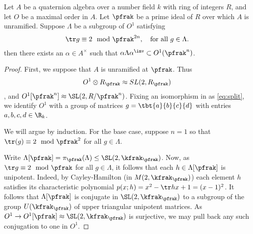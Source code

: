 \begin{lemma}\label{lemma:MangosteenPicosdeEuropa}
    Let $A$ be a quaternion algebra over a number field $k$ with ring of integers $R$, and let $O$ be a maximal order in $A$.
    Let $\pfrak$ be a prime ideal of $R$ over which $A$ is unramified.
    Suppose $\Lambda$ be a subgroup of $O^1$ satisfying
    \begin{align}\label{eq:trace}
        \tr g \equiv 2 \mod \pfrak^{2n}, \quad \text{for all $g \in \Lambda$}.
    \end{align}
    then there exists an $\alpha \in A^\times$ such that $\alpha \Lambda \alpha^\inv \subset O^1(\pfrak^n)$.
\end{lemma}
\begin{proof}

    First, we suppose that $A$ is unramified at $\pfrak$.
    Thus
    \begin{align}\label{eq:split}
        O^1 \otimes R_\pfrak \approx SL(2,R_\pfrak)
    \end{align}, and $O^1[\pfrak^n] \approx \SL(2,R/\pfrak^n)$. Fixing an isomorphism in as \ref{eq:split}, we identify $O^1$ with a group of matrices $g = \tbt{a}{b}{c}{d}$ with entries $a,b,c,d \in \R_k$.

    We will argue by induction. For the base case, suppose $n=1$ so that $\tr(g) \equiv 2 \mod \pfrak^2$ for all $g \in \Lambda$.


    Write $\Lambda[\pfrak] = \pi_{\pfrak}(\Lambda)\leq \SL(2,\kfrak_\pfrak)$. Now, as $\tr g \equiv 2 \mod \pfrak$ for all $g \in \Lambda$, it follows that each $h \in \Lambda[\pfrak]$ is unipotent.
    Indeed, by Cayley-Hamilton (in $M(2,\kfrak_\pfrak)$) each element $h$ satisfies its characteristic polynomial $p(x;h)=x^2 - \tr h x + 1= (x-1)^2$.
    It follows that $\Lambda[\pfrak]$ is conjugate in $\SL(2,\kfrak_\pfrak)$ to a subgroup of the group $U(\kfrak_\pfrak)$ of upper triangular unipotent matrices. As $O^1 \to O^1[\pfrak]\approx \SL(2,\kfrak_\pfrak)$ is surjective, we may pull back any such conjugation to one in $O^1$.


\end{proof}
